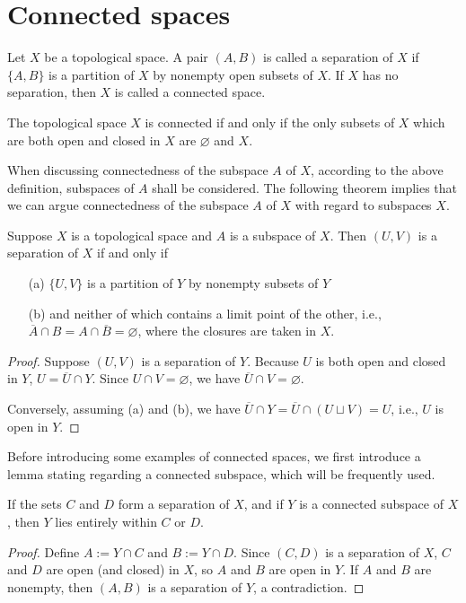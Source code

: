 \section{Connected spaces}

\begin{defi}
    Let $X$ be a topological space.
    A pair $(A, B)$ is called a separation of $X$ if $\{A, B\}$ is a partition of $X$ by nonempty open subsets of $X$.
    If $X$ has no separation, then $X$ is called a connected space.
\end{defi}
\begin{rmk}
    The topological space $X$ is connected if and only if the only subsets of $X$ which are both open and closed in $X$ are $\varnothing$ and $X$.
\end{rmk}

When discussing connectedness of the subspace $A$ of $X$, according to the above definition, subspaces of $A$ shall be considered.
The following theorem implies that we can argue connectedness of the subspace $A$ of $X$ with regard to subspaces $X$.
\begin{thm}
    Suppose $X$ is a topological space and $A$ is a subspace of $X$.
    Then $(U, V)$ is a separation of $X$ if and only if
    \begin{enumerate}
        \item[(a)]
        {
            $\{U, V\}$ is a partition of $Y$ by nonempty subsets of $Y$
        }
        \item[(b)]
        {
            and neither of which contains a limit point of the other, i.e., $\overline{A}\cap B=A\cap\overline{B}=\varnothing$, where the closures are taken in $X$.
        }
    \end{enumerate}
\end{thm}
\begin{proof}
    Suppose $(U, V)$ is a separation of $Y$.
    Because $U$ is both open and closed in $Y$, $U=\overline{U}\cap Y$.
    Since $U\cap V=\varnothing$, we have $\overline{U}\cap V=\varnothing$.

    Conversely, assuming (a) and (b), we have $\overline{U}\cap Y=\overline{U}\cap(U\sqcup V)=U$, i.e., $U$ is open in $Y$.
\end{proof}

Before introducing some examples of connected spaces, we first introduce a lemma stating regarding a connected subspace, which will be frequently used.
\begin{lem}
    If the sets $C$ and $D$ form a separation of $X$, and if $Y$ is a connected subspace of $X$, then $Y$ lies entirely within $C$ or $D$.
\end{lem}
\begin{proof}
    Define $A:=Y\cap C$ and $B:=Y\cap D$.
    Since $(C, D)$ is a separation of $X$, $C$ and $D$ are open (and closed) in $X$, so $A$ and $B$ are open in $Y$.
    If $A$ and $B$ are nonempty, then $(A, B)$ is a separation of $Y$, a contradiction.
\end{proof}

